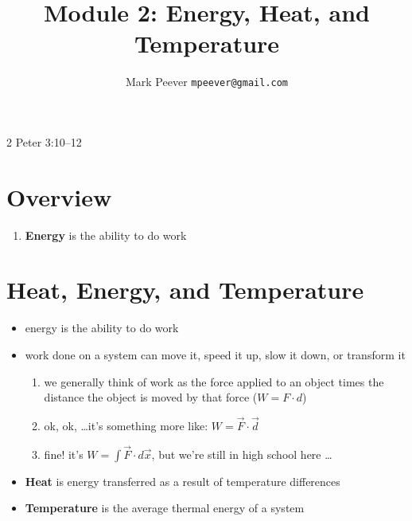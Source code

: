 \documentclass[11pt, oneside]{article}   	%
\title{Module 2: Energy, Heat, and Temperature }
\author{Mark Peever \texttt{mpeever@gmail.com}}
\begin{document}
\maketitle

\begin{center}
2 Peter 3:10--12
\end{center}

\section{Overview}
\begin{enumerate}
\item \textbf{Energy} is the ability to do work
\end{enumerate}

\section{Heat, Energy, and Temperature}
\begin{itemize}
\item energy is the ability to do work
\item work done on a system can move it, speed it up, slow it down, or transform it
\begin{enumerate}
\item we generally think of work as the force applied to an object times the distance the object is moved by that force ($W = F \cdot d$)
\item ok, ok, \ldots it's something more like: $W = \vec{F} \cdot \vec{d}$
\item fine! it's  $W = \int \vec{F} \cdot d\vec{x}$, but we're still in high school here \ldots
\end{enumerate}
\item \textbf{Heat} is energy transferred as a result of temperature differences
\item \textbf{Temperature} is the average thermal energy of a system
\end{itemize}
\end{document}
